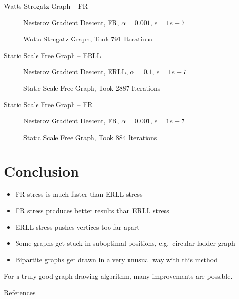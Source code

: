 \documentclass{beamer}
\begin{document}
\begin{frame}{Watts Strogatz Graph -- FR}
    \begin{figure}[H]
    \centering
    Nesterov Gradient Descent, FR, $\alpha=0.001$, $\epsilon=1e-7$
    
    \caption{\label{watts-strogatz-nesterov-fr} Watts Strogatz Graph, Took 791 Iterations}
    \end{figure}
\end{frame}

\begin{frame}{Static Scale Free Graph -- ERLL}
    \begin{figure}[H]
    \centering
    Nesterov Gradient Descent, ERLL, $\alpha=0.1$, $\epsilon=1e-7$
    
    \caption{\label{static-scale-free-nesterov-erll} Static Scale Free Graph, Took 2887 Iterations}
    \end{figure}
\end{frame}

\begin{frame}{Static Scale Free Graph -- FR}
    \begin{figure}[H]
    \centering
    Nesterov Gradient Descent, FR, $\alpha=0.001$, $\epsilon=1e-7$
    
    \caption{\label{static-scale-free-nesterov-fr} Static Scale Free Graph, Took 884 Iterations}
    \end{figure}
\end{frame}

\section{Conclusion}

\begin{frame}
\begin{itemize}
    \item FR stress is much faster than ERLL stress
    \item FR stress produces better results than ERLL stress
    \item ERLL stress pushes vertices too far apart
    \item Some graphs get stuck in suboptimal positions, e.g.\ circular ladder graph
    \item Bipartite graphs get drawn in a very unusual way with this method
\end{itemize}

For a truly good graph drawing algorithm, many improvements are possible.
\end{frame}

\begin{frame}[allowframebreaks]{References}
    \printbibliography[heading=none] %
\end{frame}
\end{document}
